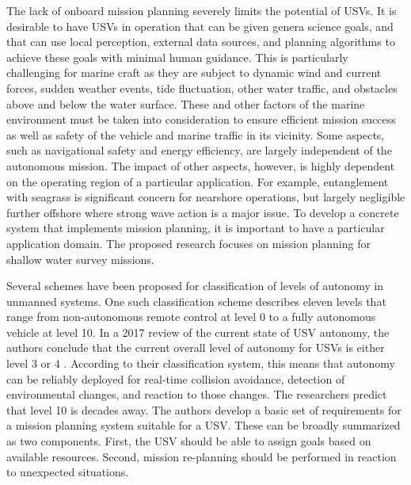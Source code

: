 \documentclass{tamuccthesis}
\begin{document}
The lack of onboard mission planning severely limits the potential of USVs. It is desirable to have USVs in operation that can be given genera science goals, and that can use local perception, external data sources, and planning algorithms to achieve these goals with minimal human guidance. This is particularly challenging for marine craft as they are subject to dynamic wind and current forces, sudden weather events, tide fluctuation, other water traffic, and obstacles above and below the water surface. These and other factors of the marine environment must be taken into consideration to ensure efficient mission success as well as safety of the vehicle and marine traffic in its vicinity. Some aspects, such as navigational safety and energy efficiency, are largely independent of the autonomous mission. The impact of other aspects, however, is highly dependent on the operating region of a particular application. For example, entanglement with seagrass is significant concern for nearshore operations, but largely negligible further offshore where strong wave action is a major issue. To develop a concrete system that implements mission planning, it is important to have a particular application domain. The proposed research focuses on mission planning for shallow water survey missions. 

Several schemes have been proposed for classification of levels of autonomy in unmanned systems. One such classification scheme describes eleven levels that range from non-autonomous remote control at level 0 to a fully autonomous vehicle at level 10. In a 2017 review of the current state of USV autonomy, the authors conclude that the current overall level of autonomy for USVs is either level 3 or 4 \cite{heo2017case}. According to their classification system, this means that autonomy can be reliably deployed for real-time collision avoidance, detection of environmental changes, and reaction to those changes. The researchers predict that level 10 is decades away. The authors develop a basic set of requirements for a mission planning system suitable for a USV. These can be broadly summarized as two components. First, the USV should be able to assign goals based on available resources. Second, mission re-planning should be performed in reaction to unexpected situations. 
\end{document}
